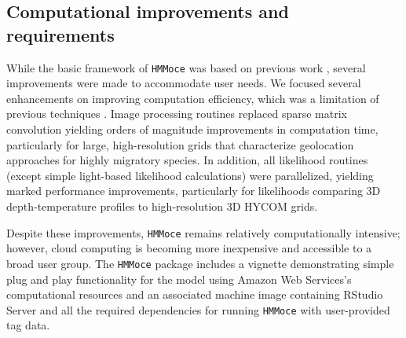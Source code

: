 \subsection{Computational improvements and
requirements}

While the basic framework of \texttt{HMMoce} was based on previous work
\citep{Pedersen2008, Thygesen2009a, Pedersen2011}, several improvements
were made to accommodate user needs. We focused several enhancements on
improving computation efficiency, which was a limitation of previous
techniques \citep[\texttt{SPHMM} code for \texttt{R};][]{Pedersen2011}.
Image processing routines replaced sparse matrix convolution yielding
orders of magnitude improvements in computation time, particularly for
large, high-resolution grids that characterize geolocation approaches
for highly migratory species. In addition, all likelihood routines
(except simple light-based likelihood calculations) were parallelized,
yielding marked performance improvements, particularly for likelihoods
comparing 3D depth-temperature profiles to high-resolution 3D HYCOM
grids.

Despite these improvements, \texttt{HMMoce} remains relatively
computationally intensive; however, cloud computing is becoming more
inexpensive and accessible to a broad user group. The \texttt{HMMoce}
package includes a vignette demonstrating simple plug and play
functionality for the model using Amazon Web Services's computational
resources and an associated machine image containing RStudio Server and
all the required dependencies for running \texttt{HMMoce} with
user-provided tag data.

